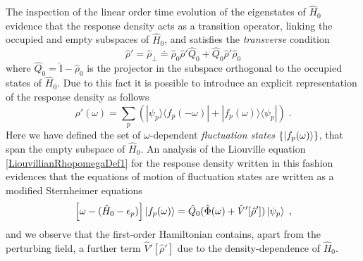 \documentclass[reprint,aps,prb]{revtex4-1}
\newcommand{\eps}{\epsilon}
\newcommand{\be}{\begin{equation}}
\newcommand{\ee}{\end{equation}}
\newcommand{\lb}{\label}
\newcommand{\op}[1]{\hat {#1}}
\newcommand{\ketbra}[2]{| #1 \rangle \langle #2 |}
\newcommand{\dmnot}{\op{\rho}_0}
\newcommand{\dm}{\op{\rho}}
\newcommand{\hnot}{\op{H}_0}
\newcommand{\identity}{\op{\mathbb I}}
\begin{document}
The inspection of the linear order time evolution of the eigenstates of $\hnot$ evidence that the response density acts as a transition operator, linking the occupied and empty subspaces 
of $\hnot$, and satisfies the \emph{transverse} condition  
\be\lb{RhopTransverseDef1}
\dm' = \dm_{\perp} \doteq \dmnot\dm'\op Q_0 + \op Q_0\dm'\dmnot
\ee
where $\op Q_0=\identity-\dmnot$ is the projector in the subspace orthogonal to the occupied states of $\hnot$. Due to this fact it is possible to introduce an explicit representation of the 
response density as follows 
\be\lb{rhoPrimeFluctuationStateDef1}
\dm'(\omega) = \sum_p\left(\ketbra{\psi_p}{f_p(-\omega)} + \ketbra{f_p(\omega)}{\psi_p}\right) \;.
\ee
Here we have defined the set of $\omega$-dependent \emph{fluctuation states} $\{\ket{f_p(\omega)}\}$, that span the empty subspace of $\hnot$. 
An analysis of the Liouville equation \eqref{LiouvillianRhopomegaDef1} for the response density written in this fashion evidences that the equations of motion of fluctuation states are 
written as a modified Sternheimer equations \cite{mahan1980}
\be\lb{fluctuationStateEqMotion1}
\left[\omega - (\hnot-\eps_p)\right]\ket{f_p(\omega)} = \op Q_0(\op\Phi(\omega)+\op V'[\dm'])\ket{\psi_p} \;,
\ee
and we observe that the first-order Hamiltonian contains, apart from the perturbing field, a further term $\op V'[\dm']$ due to the density-dependence of $\hnot$.
\end{document}
